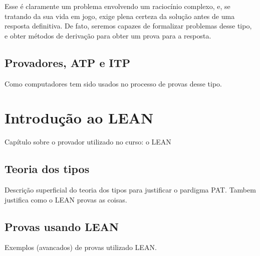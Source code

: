 Esse é claramente um problema envolvendo um raciocínio complexo, e, se tratando da sua vida em jogo, exige plena certeza da solução antes de uma resposta definitiva. De fato, seremos capazes de formalizar problemas desse tipo, e obter métodos de derivação para obter um prova para a resposta.

\section{Provadores, ATP e ITP}
Como computadores tem sido usados no processo de provas desse tipo.

\chapter{Introdução ao LEAN}
Capítulo sobre o provador utilizado no curso: o LEAN

\section{Teoria dos tipos}
Descrição superficial do teoria dos tipos para justificar o pardigma PAT.
Tambem justifica como o LEAN provas as coisas.

\section{Provas usando LEAN}
Exemplos (avancados) de provas utilizado LEAN.
